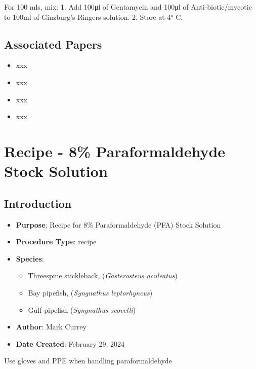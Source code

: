 \documentclass[
  letterpaper,
  DIV=11,
  numbers=noendperiod]{scrreprt}
\providecommand{\tightlist}{%
  \setlength{\itemsep}{0pt}\setlength{\parskip}{0pt}}\usepackage{longtable,booktabs,array}
\begin{document}
For 100 mls, mix: 1. Add 100μl of Gentamycin and 100μl of
Anti-biotic/mycotic to 100ml of Ginzburg's Ringers solution. 2. Store at
4° C.

\hypertarget{associated-papers-65}{%
\section{Associated Papers}\label{associated-papers-65}}

\begin{itemize}
\tightlist
\item
  xxx
\item
  xxx
\item
  xxx
\item
  xxx
\end{itemize}

\hypertarget{sec-recipe-PFA}{%
\chapter{Recipe - 8\% Paraformaldehyde Stock
Solution}\label{sec-recipe-PFA}}

\hypertarget{introduction-97}{%
\section{Introduction}\label{introduction-97}}

\begin{itemize}
\tightlist
\item
  \textbf{Purpose}: Recipe for 8\% Paraformaldehyde (PFA) Stock
  Solution\\
\item
  \textbf{Procedure Type}: recipe
\item
  \textbf{Species}:

  \begin{itemize}
  \tightlist
  \item
    Threespine stickleback, (\emph{Gasterosteus aculeatus})
  \item
    Bay pipefish, (\emph{Syngnathus leptorhyncus})
  \item
    Gulf pipefish (\emph{Syngnathus scovelli})
  \end{itemize}
\item
  \textbf{Author}: Mark Currey
\item
  \textbf{Date Created}: February 29, 2024
\end{itemize}

Use gloves and PPE when handling paraformaldehyde
\end{document}
